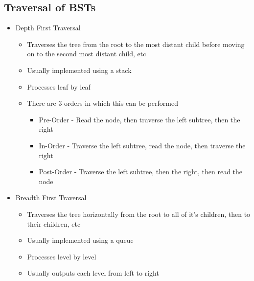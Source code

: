 \subsection*{Traversal of BSTs}

\begin{itemize}
  \item Depth First Traversal
  \begin{itemize}
    \item Traverses the tree from the root to the most distant child before moving on to the second most distant child, etc
    \item Usually implemented using a stack
    \item Processes leaf by leaf
    \item There are 3 orders in which this can be performed
    \begin{itemize}
      \item Pre-Order - Read the node, then traverse the left subtree, then the right
      \item In-Order - Traverse the left subtree, read the node, then traverse the right
      \item Post-Order - Traverse the left subtree, then the right, then read the node
    \end{itemize}
  \end{itemize}
  \item Breadth First Traversal
  \begin{itemize}
    \item Traverses the tree horizontally from the root to all of it's children, then to their children, etc
    \item Usually implemented using a queue
    \item Processes level by level
    \item Usually outputs each level from left to right
  \end{itemize}
\end{itemize}